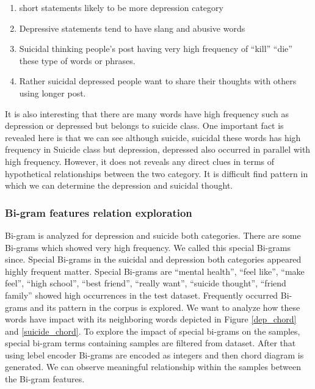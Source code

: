 \documentclass[sn-mathphys,Numbered]{sn-jnl}%
\theoremstyle{thmstyleone}%
\theoremstyle{thmstyletwo}%
\theoremstyle{thmstylethree}%
\begin{document}
\begin{enumerate}
\item short statements likely to be more depression category
\item Depressive statements tend to have slang and abusive words
\item Suicidal thinking people’s post having very high frequency of “kill” “die” these type of words or phrases.
\item Rather suicidal depressed people want to share their thoughts with others using longer post.
\end{enumerate}

It is also interesting that there are many words have high frequency such as depression or depressed but belongs to suicide class. One important fact is revealed here is that we can see although suicide, suicidal these words has high frequency in Suicide class but depression, depressed also occurred in parallel with high frequency. However, it does not reveals any direct clues in terms of hypothetical relationships between the two category. It is difficult find pattern in which we can determine the depression and suicidal thought.  

\subsubsection{Bi-gram features relation exploration}
Bi-gram is analyzed for depression and suicide both categories. There are some Bi-grams which showed very high frequency. We called this special Bi-grams since. Special Bi-grams in the suicidal and depression both categories appeared highly frequent matter. Special Bi-grams are \enquote{mental health}, \enquote{feel like}, \enquote{make feel}, \enquote{high school}, \enquote{best friend}, \enquote{really want}, \enquote{suicide thought}, \enquote{friend family} showed high occurrences in the test dataset. Frequently occurred Bi-grams and its pattern in the corpus is explored. We want to analyze how these words have impact with its neighboring words depicted in Figure \ref{dep_chord} and \ref{suicide_chord}. To explore the impact of special bi-grams on the samples, special bi-gram terms containing samples are filtered from dataset. After that using lebel encoder Bi-grams are encoded as integers and then chord diagram is generated. We can observe meaningful relationship within the samples between the Bi-gram features.  
\end{document}
